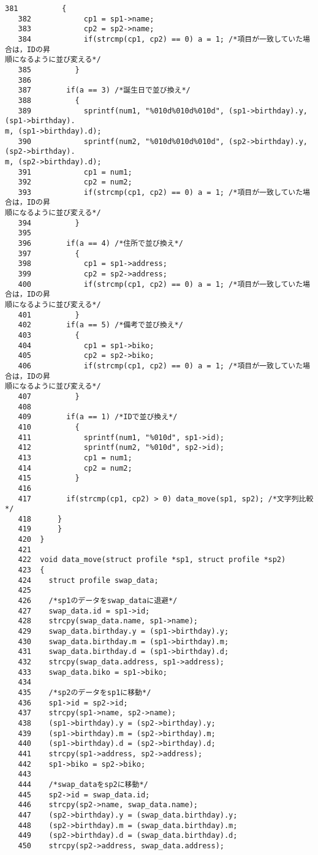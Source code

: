 \begin{Verbatim}[fontsize=\small, baselinestretch=0.8]
   381		    {
   382		      cp1 = sp1->name;
   383		      cp2 = sp2->name;
   384		      if(strcmp(cp1, cp2) == 0) a = 1; /*項目が一致していた場合は，IDの昇
順になるように並び変える*/
   385		    }
   386		  
   387		  if(a == 3) /*誕生日で並び換え*/
   388		    {
   389		      sprintf(num1, "%010d%010d%010d", (sp1->birthday).y, (sp1->birthday).
m, (sp1->birthday).d);
   390		      sprintf(num2, "%010d%010d%010d", (sp2->birthday).y, (sp2->birthday).
m, (sp2->birthday).d);
   391		      cp1 = num1;
   392		      cp2 = num2;
   393		      if(strcmp(cp1, cp2) == 0) a = 1; /*項目が一致していた場合は，IDの昇
順になるように並び変える*/
   394		    }
   395		  
   396		  if(a == 4) /*住所で並び換え*/
   397		    {
   398		      cp1 = sp1->address;
   399		      cp2 = sp2->address;
   400		      if(strcmp(cp1, cp2) == 0) a = 1; /*項目が一致していた場合は，IDの昇
順になるように並び変える*/
   401		    }
   402		  if(a == 5) /*備考で並び換え*/
   403		    {
   404		      cp1 = sp1->biko;
   405		      cp2 = sp2->biko;
   406		      if(strcmp(cp1, cp2) == 0) a = 1; /*項目が一致していた場合は，IDの昇
順になるように並び変える*/
   407		    }
   408	 	  
   409		  if(a == 1) /*IDで並び換え*/
   410		    {
   411		      sprintf(num1, "%010d", sp1->id);
   412		      sprintf(num2, "%010d", sp2->id);
   413		      cp1 = num1;
   414		      cp2 = num2;
   415		    }
   416	
   417		  if(strcmp(cp1, cp2) > 0) data_move(sp1, sp2); /*文字列比較*/
   418		}
   419	    }
   420	}
   421	
   422	void data_move(struct profile *sp1, struct profile *sp2)
   423	{
   424	  struct profile swap_data;
   425	  
   426	  /*sp1のデータをswap_dataに退避*/
   427	  swap_data.id = sp1->id;
   428	  strcpy(swap_data.name, sp1->name);
   429	  swap_data.birthday.y = (sp1->birthday).y;
   430	  swap_data.birthday.m = (sp1->birthday).m;
   431	  swap_data.birthday.d = (sp1->birthday).d;
   432	  strcpy(swap_data.address, sp1->address);
   433	  swap_data.biko = sp1->biko;
   434	
   435	  /*sp2のデータをsp1に移動*/
   436	  sp1->id = sp2->id;
   437	  strcpy(sp1->name, sp2->name);
   438	  (sp1->birthday).y = (sp2->birthday).y;
   439	  (sp1->birthday).m = (sp2->birthday).m;
   440	  (sp1->birthday).d = (sp2->birthday).d;
   441	  strcpy(sp1->address, sp2->address);
   442	  sp1->biko = sp2->biko;
   443	  
   444	  /*swap_dataをsp2に移動*/
   445	  sp2->id = swap_data.id;
   446	  strcpy(sp2->name, swap_data.name);
   447	  (sp2->birthday).y = (swap_data.birthday).y;
   448	  (sp2->birthday).m = (swap_data.birthday).m;
   449	  (sp2->birthday).d = (swap_data.birthday).d;
   450	  strcpy(sp2->address, swap_data.address);

\end{Verbatim}
